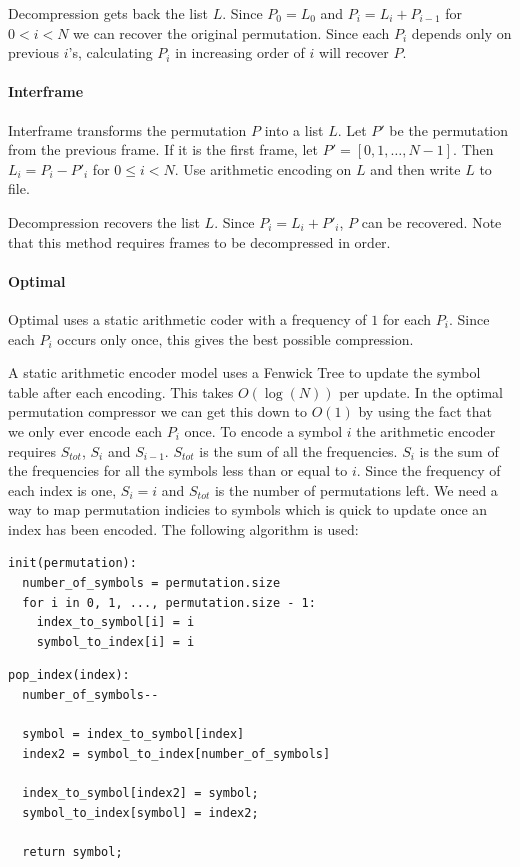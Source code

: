 \documentclass{report}
\begin{document}
Decompression gets back the list $L$. Since $P_0 = L_0$ and $P_i = L_i +
P_{i-1}$ for $0 < i < N$ we can recover the original permutation. Since each
$P_i$ depends only on previous $i$'s, calculating $P_i$ in increasing order of
$i$ will recover $P$.

\paragraph{Interframe}
Interframe transforms the permutation $P$ into a list $L$. Let $P'$ be the
permutation from the previous frame. If it is the first frame, let $P' =
[0,1,\dots,N-1]$. Then $L_i = P_i - P'_i$ for $0 \le i < N$. Use arithmetic
encoding on $L$ and then write $L$ to file.

Decompression recovers the list $L$. Since $P_i = L_i + P'_i$, $P$ can be
recovered. Note that this method requires frames to be decompressed in order.

\paragraph{Optimal}
Optimal uses a static arithmetic coder with a frequency of $1$ for each
$P_i$. Since each $P_i$ occurs only once, this gives the best possible
compression.

A static arithmetic encoder model uses a Fenwick Tree to update the symbol
table after each encoding. This takes $O(\log(N))$ per update. In the optimal
permutation compressor we can get this down to $O(1)$ by using the fact that
we only ever encode each $P_i$ once. To encode a symbol $i$ the arithmetic
encoder requires $S_{tot}$, $S_i$ and $S_{i-1}$. $S_{tot}$ is the sum of all
the frequencies. $S_i$ is the sum of the frequencies for all the symbols less
than or equal to $i$. Since the frequency of each index is one, $S_i = i$ and
$S_{tot}$ is the number of permutations left. We need a way to map permutation
indicies to symbols which is quick to update once an index has been
encoded. The following algorithm is used:

\begin{verbatim}
init(permutation):
  number_of_symbols = permutation.size
  for i in 0, 1, ..., permutation.size - 1:
    index_to_symbol[i] = i
    symbol_to_index[i] = i
\end{verbatim}

\begin{verbatim}
pop_index(index):
  number_of_symbols--

  symbol = index_to_symbol[index]
  index2 = symbol_to_index[number_of_symbols]

  index_to_symbol[index2] = symbol;
  symbol_to_index[symbol] = index2;

  return symbol;
\end{verbatim}
\end{document}
